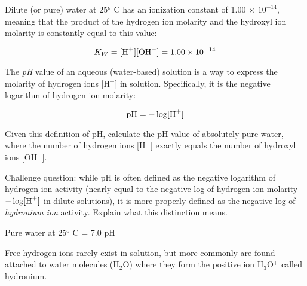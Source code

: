 

Dilute (or pure) water at 25$^{o}$ C has an ionization constant of 1.00 $\times$ $10^{-14}$, meaning that the product of the hydrogen ion molarity and the hydroxyl ion molarity is constantly equal to this value:

$$K_W = [\hbox{H}^{+}] [\hbox{OH}^{-}] = 1.00 \times 10^{-14}$$

The {\it pH} value of an aqueous (water-based) solution is a way to express the molarity of hydrogen ions [H$^{+}$] in solution.  Specifically, it is the negative logarithm of hydrogen ion molarity:

$$\hbox{pH} = - \log [\hbox{H}^{+}]$$

Given this definition of pH, calculate the pH value of absolutely pure water, where the number of hydrogen ions [H$^{+}$] exactly equals the number of hydroxyl ions [OH$^{-}$].

\vskip 10pt

Challenge question: while pH is often defined as the negative logarithm of hydrogen ion activity (nearly equal to the negative log of hydrogen ion molarity $- \log [\hbox{H}^{+}]$ in dilute solutions), it is more properly defined as the negative log of {\it hydronium ion} activity.  Explain what this distinction means.







Pure water at 25$^{o}$ C = 7.0 pH

\vskip 10pt

Free hydrogen ions rarely exist in solution, but more commonly are found attached to water molecules (H$_{2}$O) where they form the positive ion H$_{3}$O$^{+}$ called hydronium.











